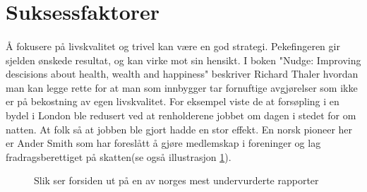 \documentclass[11pt]{memoir} %
\begin{document}
	\section{Suksessfaktorer}
		\paragraph{}
			Å fokusere på livskvalitet og trivel kan være en god strategi. Pekefingeren gir sjelden ønskede resultat, og kan virke mot sin hensikt. I boken "Nudge: Improving descisions about health, wealth and happiness"\cite{nudge} beskriver Richard Thaler hvordan man kan legge rette for at man som innbygger tar fornuftige avgjørelser som ikke er på bekostning av egen livskvalitet. For eksempel viste de at forsøpling i en bydel i London ble redusert ved at renholderene jobbet om dagen i stedet for om natten\cite{nudge}. At folk så at jobben ble gjort hadde en stor effekt. En norsk pioneer her er Ander Smith som har foreslått å gjøre medlemskap i foreninger og lag fradragsberettiget på skatten\cite{andsmi}(se også illustrasjon \ref{andsmifig}).
					\begin{figure}[h]
                      \centering
                    	  \captionsetup{singlelinecheck=off}
                      	\caption{Slik ser forsiden ut på en av norges mest undervurderte rapporter}
                      	\label{andsmifig}
                    \end{figure}   
\end{document}
